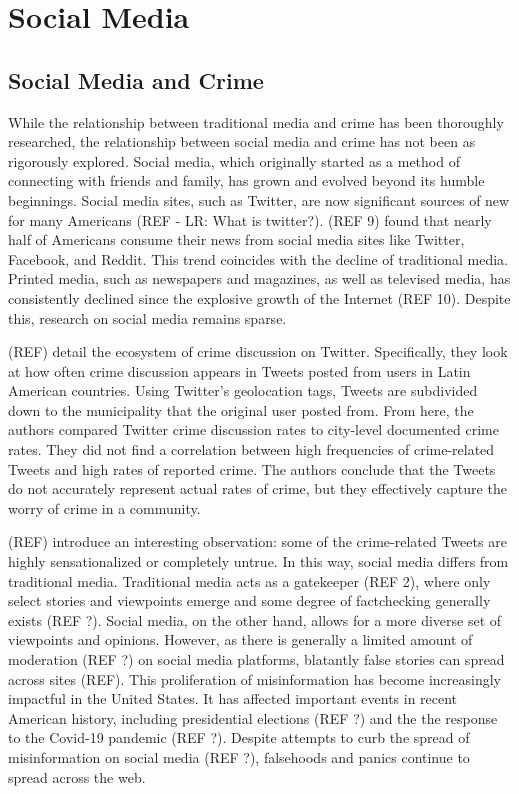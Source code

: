 \documentclass[12pt,oneside, letterpaper]{book}
\begin{document}
\section{Social Media}

\subsection{Social Media and Crime}

\par While the relationship between traditional media and crime has been thoroughly researched, the relationship between social media and crime has not been as rigorously explored. Social media, which originally started as a method of connecting with friends and family, has grown and evolved beyond its humble beginnings. Social media sites, such as Twitter, are now significant sources of new for many Americans (REF - LR: What is twitter?). (REF 9) found that nearly half of Americans consume their news from social media sites like Twitter, Facebook, and Reddit. This trend coincides with the decline of traditional media. Printed media, such as newspapers and magazines, as well as televised media, has consistently declined since the explosive growth of the Internet (REF 10). Despite this, research on social media remains sparse.


(REF) detail the ecosystem of crime discussion on Twitter. Specifically, they look at how often crime discussion appears in Tweets posted from users in Latin American countries. Using Twitter's geolocation tags, Tweets are subdivided down to the municipality that the original user posted from. From here, the authors compared Twitter crime discussion rates to city-level documented crime rates. They did not find a correlation between high frequencies of crime-related Tweets and high rates of reported crime. The authors conclude that the Tweets do not accurately represent actual rates of crime, but they effectively capture the worry of crime in a community.


(REF) introduce an interesting observation: some of the crime-related Tweets are highly sensationalized or completely untrue. In this way, social media differs from traditional media. Traditional media acts as a gatekeeper (REF 2), where only select stories and viewpoints emerge and some degree of factchecking generally exists (REF ?). Social media, on the other hand, allows for a more diverse set of viewpoints and opinions. However, as there is generally a limited amount of moderation (REF ?) on social media platforms, blatantly false stories can spread across sites (REF). This proliferation of misinformation has become increasingly impactful in the United States. It has affected important events in recent American history, including presidential elections (REF ?) and the the response to the Covid-19 pandemic (REF ?). Despite attempts to curb the spread of misinformation on social media (REF ?), falsehoods and panics continue to spread across the web.
\end{document}
